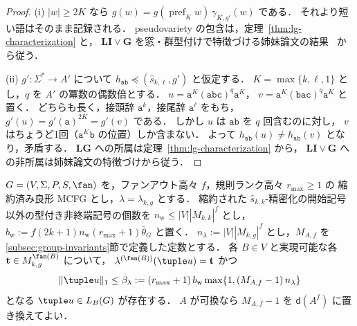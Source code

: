 \begin{proof}
(i) $|w|\ge2K$ なら $g(w)=g(\operatorname{pref}_Kw)\,\gamma_{K,g'}(w)$ である．
それより短い語はそのまま記録される．
pseudovariety の包含は，定理~\ref{thm:lg-characterization} と，
$\mathbf{LI}\vee\mathbf G$ を窓・群型付けで特徴づける姉妹論文の結果~\cite[Lemma~7.4]{kuriyamaCFG} から従う．

(ii) $g':\Sigma^*\to A'$ について $h_{\mathtt{ab}}\preceq(\widehat{s}_{k,\ell},g')$ と仮定する．
$K=\max\{k,\ell,1\}$ とし，$q$ を $A'$ の冪数の偶数倍とする．
$u=\mathtt a^K(\mathtt{abc})^q\mathtt a^K$，
$v=\mathtt a^K(\mathtt{bac})^q\mathtt a^K$ と置く．
どちらも長く，接頭辞 $\mathtt a^k$，接尾辞 $\mathtt a^\ell$ をもち，
$g'(u)=g'(\mathtt a)^{2K}=g'(v)$ である．
しかし $u$ は $\mathtt{ab}$ を $q$ 回含むのに対し，
$v$ はちょうど1回（$\mathtt a^K\mathtt b$ の位置）しか含まない．
よって $h_{\mathtt{ab}}(u)\ne h_{\mathtt{ab}}(v)$ となり，矛盾する．
$\mathbf{LG}$ への所属は定理~\ref{thm:lg-characterization} から，
$\mathbf{LI}\vee\mathbf G$ への非所属は姉妹論文の特徴づけから従う．
\end{proof}

\begin{lemma}[局所群型を指定した短いタプル]
\label{lem:local-group-shortest}
$G=(V,\Sigma,P,S,\fan)$ を，ファンアウト高々 $f$，規則ランク高々 $r_{\max}\ge1$ の
縮約済み良形 MCFG とし，$\lambda=\lambda_{k,g}$ とする．
縮約された $\widehat{s}_{k,k}$-精密化の開始記号以外の型付き非終端記号の個数を
$n_{\mathrm w}\le|V||M_{k,k}|^f$ とし，
$b_{\mathrm w}:=f(2k+1)n_{\mathrm w}(r_{\max}+1)\bar\theta_G$ と置く．
$n_\lambda:=|V||M_{k,g}|^f$ とし，$M_{A,f}$ を\ref{subsec:group-invariants}節で定義した定数とする．
各 $B\in V$ と実現可能な各 $\mathbf t\in M_{k,g}^{\fan(B)}$ について，
$\lambda^{(\fan(B))}(\tuple u)=\mathbf t$ かつ
\[
 \|\tuple u\|_1\le\beta_\lambda:=(r_{\max}+1)\,b_{\mathrm w}
 \max\{1,(M_{A,f}-1)\,n_\lambda\}
\]
となる $\tuple u\in L_B(G)$ が存在する．
$A$ が可換なら $M_{A,f}-1$ を $\mathsf d(A^f)$ に置き換えてよい．
\end{lemma}

